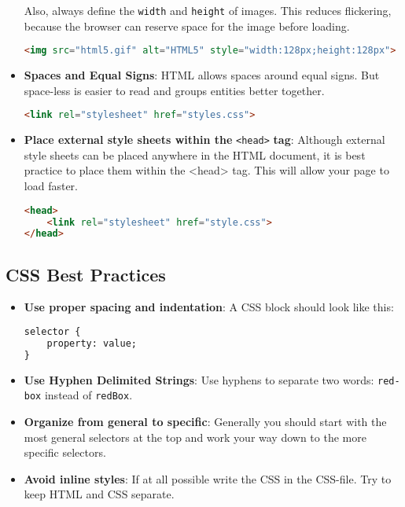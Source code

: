 \documentclass[11pt,a4paper]{report}
\newcommand{\bfb}[1]{{\bf \color{blue} #1}}
\begin{document}
\begin{itemize}
Also, always define the \verb|width| and \verb|height| of images. This reduces flickering, because the browser can reserve space for the image before loading.
\begin{lstlisting}[language=html]
<img src="html5.gif" alt="HTML5" style="width:128px;height:128px">
\end{lstlisting}

\item \bfb{Spaces and Equal Signs}: HTML allows spaces around equal signs. But space-less is easier to read and groups entities better together.

\begin{lstlisting}[language=html]
<link rel="stylesheet" href="styles.css">
\end{lstlisting}

\item \bfb{Place external style sheets within the} \verb|<head>| \bfb{tag}: Although external style sheets can be placed anywhere in the HTML document, it is best practice to place them within the <head> tag. This will allow your page to load faster.

\begin{lstlisting}[language=html]
<head>
    <link rel="stylesheet" href="style.css">
</head>
\end{lstlisting}


\end{itemize}


\subsection{CSS Best Practices}

\begin{itemize}
\item \bfb{Use proper spacing and indentation}: A CSS block should look like this:
\begin{lstlisting}[language=html]
selector {
    property: value;
}
\end{lstlisting}


\item \bfb{Use Hyphen Delimited Strings}: Use hyphens to separate two words: \verb|red-box| instead of \verb|redBox|. 

\item \bfb{Organize from general to specific}: Generally you should start with the most general selectors at the top and work your way down to the more specific selectors.  

\item \bfb{Avoid inline styles}: If at all possible write the CSS in the CSS-file. Try to keep HTML and CSS separate.
\end{itemize}
\end{document}
